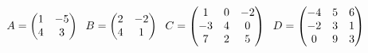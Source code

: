 \subsection{}
\begin{math}
    A=\begin{pmatrix}
        1 & -5\\
        4 & 3
    \end{pmatrix}
    \hspace{6px}
    B=\begin{pmatrix}
        2 & -2\\
        4 & 1
    \end{pmatrix}
    \hspace{6px}
    C=\begin{pmatrix}
        1 & 0 & -2\\
        -3 & 4 & 0\\
        7 & 2 & 5
    \end{pmatrix}
    \hspace{6px}
    D=\begin{pmatrix}
        -4 & 5 & 6\\
        -2 & 3 & 1\\
        0 & 9 & 3
    \end{pmatrix}
\end{math}
